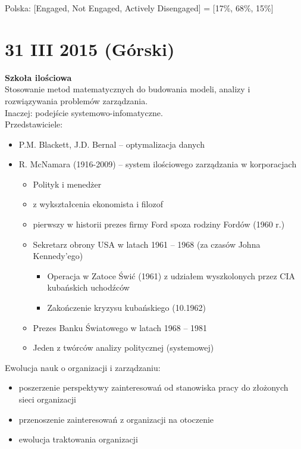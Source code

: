 \documentclass[a4paper,10pt]{report}
\begin{document}
Polska: [Engaged, Not Engaged, Actively Disengaged] = [17\%, 68\%, 15\%]

\section{31 III 2015 (Górski)}

\textbf{Szkoła ilościowa} \\

Stosowanie metod matematycznych do budowania modeli, analizy i rozwiązywania problemów zarządzania.\\
Inaczej: podejście systemowo-infomatyczne.\\
Przedstawiciele:
\begin{itemize}
	\item P.M. Blackett, J.D. Bernal -- optymalizacja danych
	\item R. McNamara (1916-2009) -- system ilościowego zarządzania w korporacjach
	\begin{itemize}
		\item Polityk i menedżer
		\item z wykształcenia ekonomista i filozof
		\item pierwszy w historii prezes firmy Ford spoza rodziny Fordów (1960 r.)
		\item Sekretarz obrony USA w latach 1961 -- 1968 (za czasów Johna Kennedy'ego)
		\begin{itemize}
			\item Operacja w Zatoce Świć (1961) z udziałem wyszkolonych przez CIA kubańskich uchodźców
			\item Zakończenie kryzysu kubańskiego (10.1962)
		\end{itemize}
		\item Prezes Banku Światowego w latach 1968 -- 1981
		\item Jeden z twórców analizy politycznej (systemowej)
	\end{itemize}
\end{itemize}

Ewolucja nauk o organizacji i zarządzaniu:
\begin{itemize}
	\item poszerzenie perspektywy zainteresowań od stanowiska pracy do złożonych sieci organizacji
	\item przenoszenie zainteresowań z organizacji na otoczenie
	\item ewolucja traktowania organizacji
\end{itemize}
\end{document}
